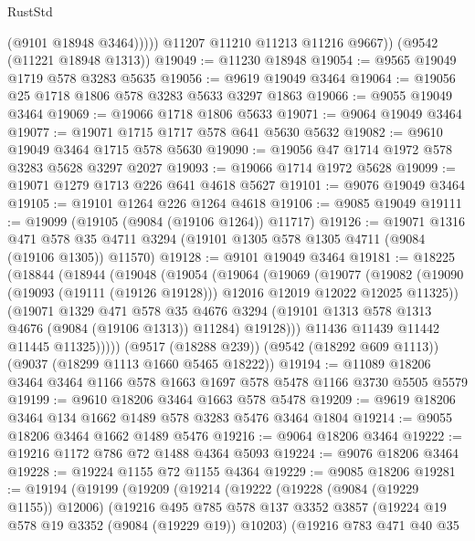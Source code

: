 \begin{lexlean}{RustStd}
\begin{coremodule}
                (@9101 @18948 @3464)))))
        @11207
        @11210
        @11213
        @11216
        @9667))
    (@9542 (@11221 @18948 @1313))
@19049 := @11230 @18948
@19054 := @9565 @19049 @1719 @578 @3283 @5635
@19056 := @9619 @19049 @3464
@19064 := @19056 @25 @1718 @1806 @578 @3283 @5633 @3297 @1863
@19066 := @9055 @19049 @3464
@19069 := @19066 @1718 @1806 @5633
@19071 := @9064 @19049 @3464
@19077 := @19071 @1715 @1717 @578 @641 @5630 @5632
@19082 := @9610 @19049 @3464 @1715 @578 @5630
@19090 := @19056 @47 @1714 @1972 @578 @3283 @5628 @3297 @2027
@19093 := @19066 @1714 @1972 @5628
@19099 := @19071 @1279 @1713 @226 @641 @4618 @5627
@19101 := @9076 @19049 @3464
@19105 := @19101 @1264 @226 @1264 @4618
@19106 := @9085 @19049
@19111 := @19099 (@19105 (@9084 (@19106 @1264)) @11717)
@19126 := @19071
    @1316
    @471
    @578
    @35
    @4711
    @3294
    (@19101 @1305 @578 @1305 @4711 (@9084 (@19106 @1305)) @11570)
@19128 := @9101 @19049 @3464
@19181 := @18225
    (@18844
      (@18944
        (@19048
          (@19054
            (@19064
              (@19069
                (@19077
                  (@19082
                    (@19090 (@19093 (@19111 (@19126 @19128))) @12016 @12019 @12022 @12025 @11325))
                  (@19071
                    @1329
                    @471
                    @578
                    @35
                    @4676
                    @3294
                    (@19101 @1313 @578 @1313 @4676 (@9084 (@19106 @1313)) @11284)
                    @19128)))
              @11436
              @11439
              @11442
              @11445
              @11325)))))
    (@9517 (@18288 @239))
    (@9542 (@18292 @609 @1113))
    (@9037 (@18299 @1113 @1660 @5465 @18222))
@19194 := @11089 @18206 @3464 @3464 @1166 @578 @1663 @1697 @578 @5478 @1166 @3730 @5505 @5579
@19199 := @9610 @18206 @3464 @1663 @578 @5478
@19209 := @9619 @18206 @3464 @134 @1662 @1489 @578 @3283 @5476 @3464 @1804
@19214 := @9055 @18206 @3464 @1662 @1489 @5476
@19216 := @9064 @18206 @3464
@19222 := @19216 @1172 @786 @72 @1488 @4364 @5093
@19224 := @9076 @18206 @3464
@19228 := @19224 @1155 @72 @1155 @4364
@19229 := @9085 @18206
@19281 := @19194
    (@19199
      (@19209
        (@19214
          (@19222
            (@19228 (@9084 (@19229 @1155)) @12006)
            (@19216
              @495
              @785
              @578
              @137
              @3352
              @3857
              (@19224 @19 @578 @19 @3352 (@9084 (@19229 @19)) @10203)
              (@19216
                @783
                @471
                @40
                @35

\end{coremodule}
\end{lexlean}
